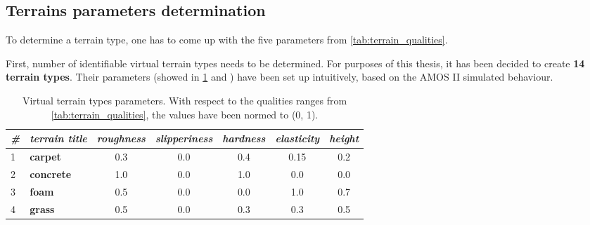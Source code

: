 \subsection*{Terrains parameters determination}
To determine a terrain type, one has to come up with the five parameters from \cref{tab:terrain_qualities}.

First, number of identifiable virtual terrain types needs to be determined. For purposes of this thesis, it has been decided to create \textbf{14 terrain types}. Their parameters (showed in \cref{tab:terrains_parameters} and ) have been set up intuitively, based on the AMOS II simulated behaviour.

\begin{table}[H]
\centering
\caption{Virtual terrain types parameters. With respect to the qualities ranges from \cref{tab:terrain_qualities}, the values have been normed to (0, 1).}
\label{tab:terrains_parameters}
\begin{tabular}{|l|l|c|c|c|c|c|}
\hline
\textit{\#}                                       & \textit{terrain title} & \multicolumn{1}{l|}{\textit{roughness}} & \multicolumn{1}{l|}{\textit{slipperiness}} & \multicolumn{1}{l|}{\textit{hardness}} & \multicolumn{1}{l|}{\textit{elasticity}} & \multicolumn{1}{l|}{\textit{height}} \\ \hline
\cellcolor[HTML]{876496}1                         & \textbf{carpet}        & 0.3                                     & 0.0                                        & 0.4                                    & 0.15                                     & 0.2                                  \\ \hline
\cellcolor[HTML]{9C9FA6}2                         & \textbf{concrete}      & 1.0                                     & 0.0                                        & 1.0                                    & 0.0                                      & 0.0                                  \\ \hline
\cellcolor[HTML]{DCE696}3                         & \textbf{foam}          & 0.5                                     & 0.0                                        & 0.0                                    & 1.0                                      & 0.7                                  \\ \hline
\cellcolor[HTML]{239614}4                         & \textbf{grass}         & 0.5                                     & 0.0                                        & 0.3                                    & 0.3                                      & 0.5                                  \\ \hline

\end{tabular}
\end{table}
